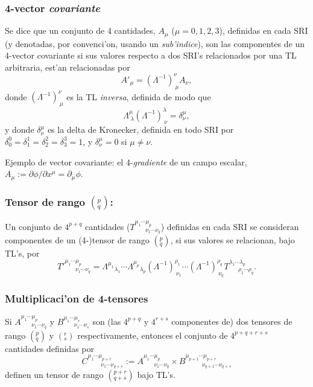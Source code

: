 \subsubsection{4-vector \textit{covariante}}
Se dice que un conjunto de 4 cantidades, $A_\mu$ ($\mu=0,1,2,3$), definidas en cada SRI (y denotadas, por convenci'on, usando un \textit{sub'indice}), son las componentes de un 4-vector covariante si sus valores respecto a dos SRI's relacionados por una TL arbitraria, est'an relacionadas por
\begin{equation}
A'_\mu=\left( \Lambda^{-1}\right)^\nu _{\ \mu}A_{\nu},
\end{equation}
donde $\left( \Lambda^{-1}\right)^\nu _{\ \mu}$ es la TL \textit{inversa}, definida de modo que
\begin{equation}
\Lambda^\mu_{\ \lambda}\left( \Lambda^{-1}\right)^{\lambda}_{\
\nu}=\delta^\mu_\nu ,
\end{equation}
y donde $\delta^\mu_\nu$ es la delta de Kronecker, definida en todo SRI por 
$\delta^0_0=\delta^1_1=\delta^2_2=\delta^3_3=1$, y $\delta^\mu_\nu=0$ si
$\mu\neq\nu$. 

Ejemplo de vector covariante: el 4-\textit{gradiente} de un campo escalar, $A_\mu:={\partial\phi}/{\partial x^\mu}=\partial_\mu\phi$.

\subsubsection{Tensor de rango $(^p_q)$:}
Un conjunto de $4^{p+q}$ cantidades ($T^{\mu_1 \cdots\mu_p}_{\ \ \ \ \ \ \ \
\nu_1\cdots\nu_q}$) definidas en cada SRI se consideran componentes de un (4-)tensor de rango $(^p_q)$, si sus valores se relacionan, bajo TL's, por
\begin{equation}
T'^{\mu_1 \cdots\mu_p}_{\ \ \ \ \ \ \ \
\nu_1\cdots\nu_q}={\Lambda^{\mu_1}}_{\lambda_1} \cdots
{\Lambda^{\mu_p}}_{\lambda_p} \left( \Lambda^{-1}\right) ^{\rho_1}_{\
\nu_1}\cdots\left( \Lambda^{-1}\right) ^{\rho_q}_{\ \nu_q} T^{\lambda_1
\cdots\lambda_p}_{\ \ \ \ \ \ \ \rho_1\cdots\rho_q}. 
\end{equation}

\subsubsection{Multiplicaci'on de 4-tensores}
 Si $A^{\mu_1 \cdots\mu_p}_{\ \ \ \ \ \ \ \
\nu_1\cdots\nu_q}$ y $B^{\mu_1 \cdots\mu_r}_{\ \ \ \ \ \ \ \
\nu_1\cdots\nu_s}$ son (las $4^{p+q}$ y $4^{r+s}$ componentes de) dos tensores de rango $(^p_q)$ y $(^r_s)$ respectivamente, entonces el
conjunto de $4^{p+q+r+s}$ cantidades definidas por
\begin{equation}
C^{\mu_1 \cdots\mu_{p+r}}_{\ \ \ \ \ \ \ \ \ \
\nu_1\cdots\nu_{q+s}}:=A^{\mu_1 \cdots\mu_p}_{\ \ \ \ \ \ \ \
\nu_1\cdots\nu_q}\times B^{\mu_{p+1} \cdots\mu_{p+r}}_{\ \ \ \ \ \ \ \ \ \ \ \ \, \nu_{q+1}\cdots\nu_{q+s}}
\end{equation}
definen un tensor de rango $(^{p+r}_{q+s})$ bajo TL's.

